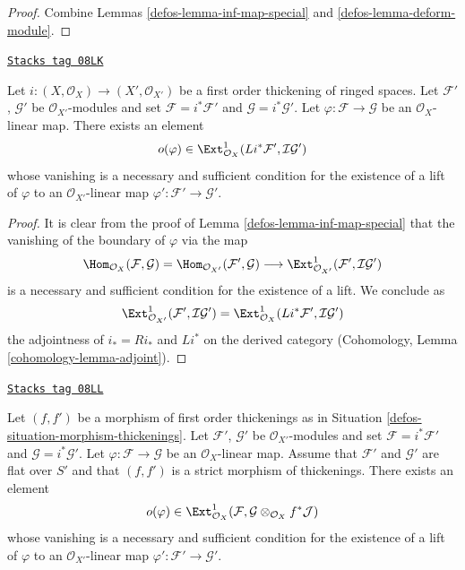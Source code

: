 \begin{proof}

Combine Lemmas \ref{defos-lemma-inf-map-special} and \ref{defos-lemma-deform-module}.
\end{proof}

\begin{lemma}
\label{defos-lemma-inf-obs-map-special}
\href{https://stacks.math.columbia.edu/tag/08LK}{\texttt{Stacks tag 08LK}}

Let $i : (X, \mathcal{O}_X) \to (X', \mathcal{O}_{X'})$
be a first order thickening of ringed spaces.
Let $\mathcal{F}'$, $\mathcal{G}'$ be $\mathcal{O}_{X'}$-modules and set
$\mathcal{F} = i^*\mathcal{F}'$ and $\mathcal{G} = i^*\mathcal{G}'$.
Let $\varphi : \mathcal{F} \to \mathcal{G}$ be an $\mathcal{O}_X$-linear map.
There exists an element
$$
o(\varphi) \in
\Ext^1_{\mathcal{O}_X}(Li^*\mathcal{F}',
\mathcal{I}\mathcal{G}')
$$
whose vanishing is a necessary and sufficient condition for the
existence of a lift of $\varphi$ to an $\mathcal{O}_{X'}$-linear map
$\varphi' : \mathcal{F}' \to \mathcal{G}'$.
\end{lemma}

\begin{proof}

It is clear from the proof of Lemma \ref{defos-lemma-inf-map-special} that the
vanishing of the boundary of $\varphi$ via the map
$$
\Hom_{\mathcal{O}_X}(\mathcal{F}, \mathcal{G}) =
\Hom_{\mathcal{O}_{X'}}(\mathcal{F}', \mathcal{G}) \longrightarrow
\Ext^1_{\mathcal{O}_{X'}}(\mathcal{F}', \mathcal{I}\mathcal{G}')
$$
is a necessary and sufficient condition for the existence of a lift. We
conclude as
$$
\Ext^1_{\mathcal{O}_{X'}}(\mathcal{F}', \mathcal{I}\mathcal{G}') =
\Ext^1_{\mathcal{O}_X}(Li^*\mathcal{F}', \mathcal{I}\mathcal{G}')
$$
the adjointness of $i_* = Ri_*$ and $Li^*$ on the derived category
(Cohomology, Lemma \ref{cohomology-lemma-adjoint}).
\end{proof}

\begin{lemma}
\label{defos-lemma-inf-obs-map-rel}
\href{https://stacks.math.columbia.edu/tag/08LL}{\texttt{Stacks tag 08LL}}

Let $(f, f')$ be a morphism of first
order thickenings as in Situation \ref{defos-situation-morphism-thickenings}.
Let $\mathcal{F}'$, $\mathcal{G}'$ be $\mathcal{O}_{X'}$-modules and set
$\mathcal{F} = i^*\mathcal{F}'$ and $\mathcal{G} = i^*\mathcal{G}'$.
Let $\varphi : \mathcal{F} \to \mathcal{G}$ be an $\mathcal{O}_X$-linear map.
Assume that $\mathcal{F}'$ and $\mathcal{G}'$ are flat over $S'$ and
that $(f, f')$ is a strict morphism of thickenings. There exists an element
$$
o(\varphi) \in  \Ext^1_{\mathcal{O}_X}(\mathcal{F},
\mathcal{G} \otimes_{\mathcal{O}_X} f^*\mathcal{J})
$$
whose vanishing is a necessary and sufficient condition for the
existence of a lift of $\varphi$ to an $\mathcal{O}_{X'}$-linear map
$\varphi' : \mathcal{F}' \to \mathcal{G}'$.
\end{lemma}

